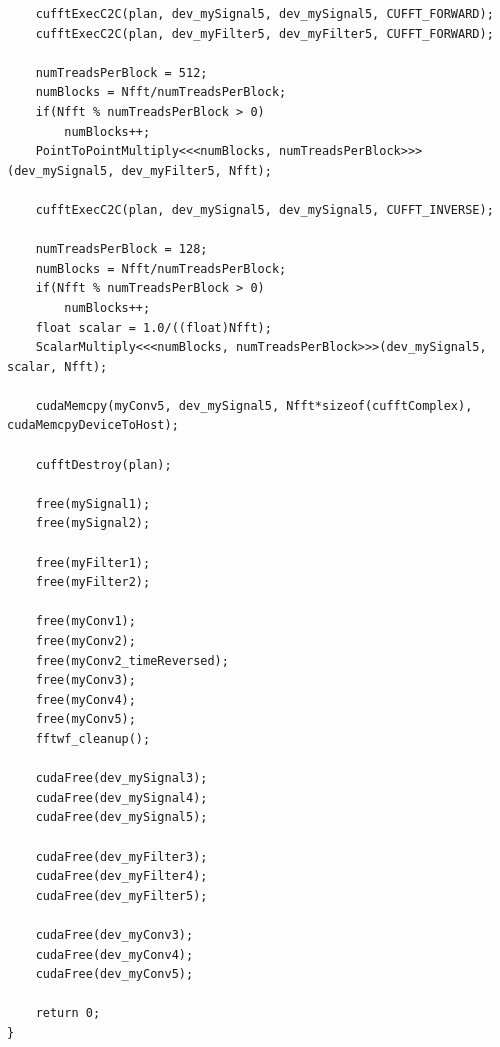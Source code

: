 \begin{lstlisting}
	cufftExecC2C(plan, dev_mySignal5, dev_mySignal5, CUFFT_FORWARD);
	cufftExecC2C(plan, dev_myFilter5, dev_myFilter5, CUFFT_FORWARD);

	numTreadsPerBlock = 512;
	numBlocks = Nfft/numTreadsPerBlock;
	if(Nfft % numTreadsPerBlock > 0)
		numBlocks++;
	PointToPointMultiply<<<numBlocks, numTreadsPerBlock>>>(dev_mySignal5, dev_myFilter5, Nfft);

	cufftExecC2C(plan, dev_mySignal5, dev_mySignal5, CUFFT_INVERSE);

	numTreadsPerBlock = 128;
	numBlocks = Nfft/numTreadsPerBlock;
	if(Nfft % numTreadsPerBlock > 0)
		numBlocks++;
	float scalar = 1.0/((float)Nfft);
	ScalarMultiply<<<numBlocks, numTreadsPerBlock>>>(dev_mySignal5, scalar, Nfft);

	cudaMemcpy(myConv5, dev_mySignal5, Nfft*sizeof(cufftComplex), cudaMemcpyDeviceToHost);

	cufftDestroy(plan);

	free(mySignal1);
	free(mySignal2);

	free(myFilter1);
	free(myFilter2);

	free(myConv1);
	free(myConv2);
	free(myConv2_timeReversed);
	free(myConv3);
	free(myConv4);
	free(myConv5);
	fftwf_cleanup();

	cudaFree(dev_mySignal3);
	cudaFree(dev_mySignal4);
	cudaFree(dev_mySignal5);

	cudaFree(dev_myFilter3);
	cudaFree(dev_myFilter4);
	cudaFree(dev_myFilter5);

	cudaFree(dev_myConv3);
	cudaFree(dev_myConv4);
	cudaFree(dev_myConv5);

	return 0;
}
\end{lstlisting}
\doublespacing

